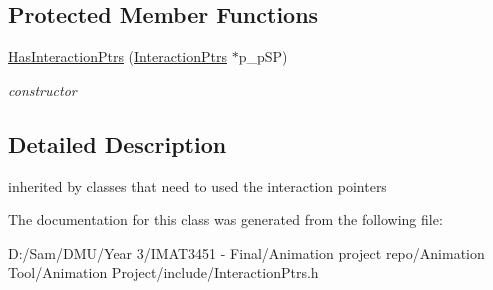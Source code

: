 \subsection*{Protected Member Functions}
\begin{DoxyCompactItemize}
\item 
\mbox{\label{class_has_interaction_ptrs_a44e282717a0bf39994df55b5153874a4}} 
\hyperlink{class_has_interaction_ptrs_a44e282717a0bf39994df55b5153874a4}{Has\+Interaction\+Ptrs} (\hyperlink{struct_interaction_ptrs}{Interaction\+Ptrs} $\ast$p\+\_\+p\+SP)
\begin{DoxyCompactList}\small\item\em constructor \end{DoxyCompactList}\end{DoxyCompactItemize}


\subsection{Detailed Description}
inherited by classes that need to used the interaction pointers 

The documentation for this class was generated from the following file\+:\begin{DoxyCompactItemize}
\item 
D\+:/\+Sam/\+D\+M\+U/\+Year 3/\+I\+M\+A\+T3451 -\/ Final/\+Animation project repo/\+Animation Tool/\+Animation Project/include/Interaction\+Ptrs.\+h\end{DoxyCompactItemize}

